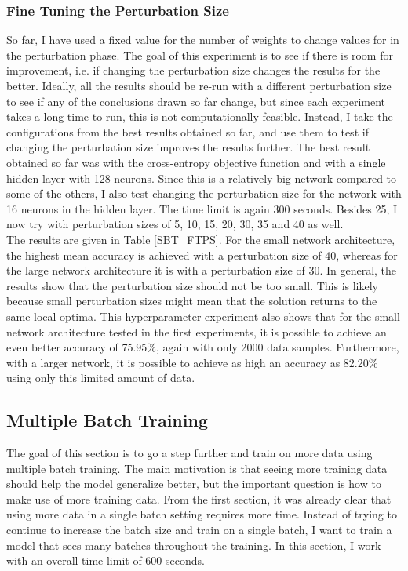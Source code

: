 


\subsubsection{Fine Tuning the Perturbation Size}

\noindent So far, I have used a fixed value for the number of weights to change values for in the perturbation phase. The goal of this experiment is to see if there is room for improvement, i.e. if changing the perturbation size changes the results for the better. Ideally, all the results should be re-run with a different perturbation size to see if any of the conclusions drawn so far change, but since each experiment takes a long time to run, this is not computationally feasible. Instead, I take the configurations from the best results obtained so far, and use them to test if changing the perturbation size improves the results further. The best result obtained so far was with the cross-entropy objective function and with a single hidden layer with 128 neurons. Since this is a relatively big network compared to some of the others, I also test changing the perturbation size for the network with 16 neurons in the hidden layer. The time limit is again 300 seconds. Besides 25, I now try with perturbation sizes of 5, 10, 15, 20, 30, 35 and 40 as well. \\

\noindent The results are given in Table \ref{SBT_FTPS}. For the small network architecture, the highest mean accuracy is achieved with a perturbation size of 40, whereas for the large network architecture it is with a perturbation size of 30. In general, the results show that the perturbation size should not be too small. This is likely because small perturbation sizes might mean that the solution returns to the same local optima. This hyperparameter experiment also shows that for the small network architecture tested in the first experiments, it is possible to achieve an even better accuracy of 75.95\%, again with only 2000 data samples. Furthermore, with a larger network, it is possible to achieve as high an accuracy as 82.20\% using only this limited amount of data. 



\subsection{Multiple Batch Training}
The goal of this section is to go a step further and train on more data using multiple batch training. The main motivation is that seeing more training data should help the model generalize better, but the important question is how to make use of more training data. From the first section, it was already clear that using more data in a single batch setting requires more time. Instead of trying to continue to increase the batch size and train on a single batch, I want to train a model that sees many batches throughout the training. In this section, I work with an overall time limit of 600 seconds.\\

